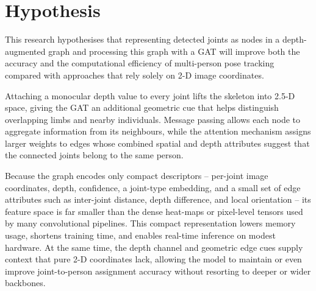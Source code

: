 \section{Hypothesis}

This research hypothesises that representing detected joints as nodes in a
depth-augmented graph and processing this graph with a GAT will improve both
the accuracy and the computational efficiency of multi-person pose tracking
compared with approaches that rely solely on 2-D image coordinates.

Attaching a monocular depth value to every joint lifts the skeleton into
2.5-D space, giving the GAT an additional geometric cue that helps distinguish
overlapping limbs and nearby individuals.  Message passing allows each node to
aggregate information from its neighbours, while the attention mechanism
assigns larger weights to edges whose combined spatial and depth attributes
suggest that the connected joints belong to the same person.  

Because the graph encodes only compact descriptors -- per-joint image
coordinates, depth, confidence, a joint-type embedding, and a small set of
edge attributes such as inter-joint distance, depth difference, and local
orientation -- its feature space is far smaller than the dense heat-maps or
pixel-level tensors used by many convolutional pipelines.  This compact
representation lowers memory usage, shortens training time, and enables
real-time inference on modest hardware.  At the same time, the depth channel
and geometric edge cues supply context that pure 2-D coordinates lack,
allowing the model to maintain or even improve joint-to-person assignment
accuracy without resorting to deeper or wider backbones.